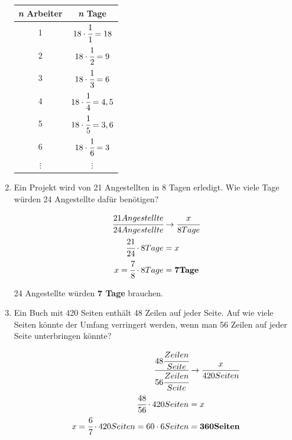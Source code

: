 \documentclass[a4paper,10pt]{article} %
\begin{document}
\begin{enumerate}
    \begin{table}[h!]
      \begin{center}
        \begin{tabular}{c | c}
          \textbf{\textit{n} Arbeiter} & \textbf{\textit{n} Tage}\\
          \hline
          1 & \(18 \cdot \cfrac{1}{1} = 18\) \\
          2 & \(18 \cdot \cfrac{1}{2} = 9\) \\
          3 & \(18 \cdot \cfrac{1}{3} = 6\) \\
          4 & \(18 \cdot \cfrac{1}{4} = 4,5\) \\
          5 & \(18 \cdot \cfrac{1}{5} = 3,6\) \\
          6 & \(18 \cdot \cfrac{1}{6} = 3\) \\
          \(\vdots\) & \(\vdots\) \\
        \end{tabular}
      \end{center}
    \end{table}

  \item Ein Projekt wird von 21 Angestellten in 8 Tagen erledigt. Wie viele Tage
    würden 24 Angestellte dafür benötigen?

    \[
      \begin{aligned}
        \cfrac{21 Angestellte}{24 Angestellte} &\rightarrow \cfrac{x}{8 Tage} \\
        \cfrac{21}{24} \cdot 8 Tage &= x \\
        x = \cfrac{7}{8} \cdot 8 Tage &= \mathbf{7 Tage}
      \end{aligned}
    \]

    24 Angestellte würden \textbf{7 Tage} brauchen.

  \item Ein Buch mit 420 Seiten enthält 48 Zeilen auf jeder Seite. Auf wie viele
    Seiten könnte der Umfang verringert werden, wenn man 56 Zeilen auf jeder Seite
    unterbringen könnte?

    \[
      \begin{aligned}
        \cfrac{48 \cfrac{Zeilen}{Seite}}{56 \cfrac{Zeilen}{Seite}} &\rightarrow \cfrac{x}{420 Seiten} \\
        \cfrac{48}{56} \cdot 420 Seiten &= x \\
        x = \cfrac{6}{7} \cdot 420 Seiten = 60 \cdot 6 Seiten &= \mathbf{360 Seiten}
      \end{aligned}
    \]


\end{enumerate}
\end{document}
